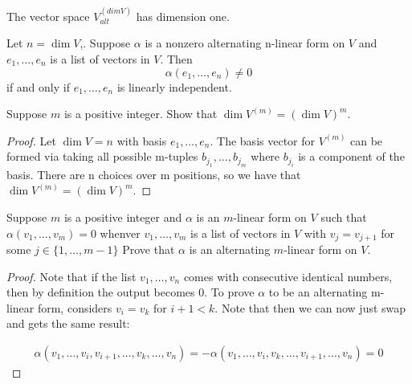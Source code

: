 \documentclass{extarticle}
\begin{document}
\begin{thm}
    The vector space \(V_{alt}^{(dim V)}\) has dimension one.
\end{thm}

\begin{corollary}
    Let \(n = \dim V\),. Suppose \(\alpha\) is a nonzero alternating n-linear form on \(V\) and 
    \(e_1, \ldots, e_n\) is a list of vectors in \(V\). Then 
    \[\alpha (e_1, \ldots, e_n) \neq 0\]
    if and only if \(e_1, \ldots, e_n\) is linearly independent. 
\end{corollary}





\newpage 
{}


\begin{problem}{1}
    Suppose \(m\) is a positive integer. Show that \(\dim V^{(m)} = \left( \dim V \right)^m\).
\end{problem}

\begin{proof}
Let \(\dim V = n\) with basis \(e_1, \ldots, e_n\). The basis vector for \(V^{(m)}\) can be formed 
via taking all possible m-tuples \(b_{j_1}, \ldots, b_{j_m}\) where \(b_{j_i}\) is a component of the basis. 
There are n choices over m positions, so we have that \(\dim V^{(m)} = \left( \dim V \right)^m\).
\end{proof}


\begin{problem}{3}
    Suppose \(m\) is a positive integer and \(\alpha\) is an \(m\)-linear form on \(V\) such that 
    \(\alpha(v_1, \ldots, v_m) = 0\) whenver \(v_1, \ldots, v_m\) is a list of vectors in \(V\) with 
    \(v_j = v_{j+1}\) for some \(j \in \{1, \ldots, m-1\}\) Prove that \(\alpha\) is an alternating 
    \(m\)-linear form on \(V\).
\end{problem}

\begin{proof}
Note that if the list \(v_1, \ldots, v_n\) comes with consecutive identical numbers, then by definition the 
output becomes 0. To prove \(\alpha\) to be an alternating m-linear form, considers \(v_i = v_k\) for 
\(i+1 < k\). Note that then we can now just swap and gets the same result: 

\begin{align*}
    \alpha(v_1, \ldots, v_i, v_{i+1}, \ldots, v_k, \ldots, v_n)  
    = - \alpha(v_1, \ldots, v_i, v_{k}, \ldots, v_{i+1}, \ldots, v_n) = 0  
\end{align*}
\end{proof}
\end{document}
